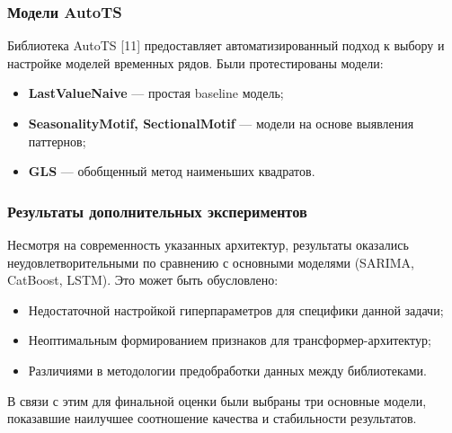 \subsubsection{Модели AutoTS}

Библиотека AutoTS [11] предоставляет автоматизированный подход к выбору и настройке моделей временных рядов. Были протестированы модели:
\begin{itemize}
	\item \textbf{LastValueNaive} --- простая baseline модель;
	\item \textbf{SeasonalityMotif, SectionalMotif} --- модели на основе выявления паттернов;
	\item \textbf{GLS} --- обобщенный метод наименьших квадратов.
\end{itemize}

\subsubsection{Результаты дополнительных экспериментов}

Несмотря на современность указанных архитектур, результаты оказались неудовлетворительными по сравнению с основными моделями (SARIMA, CatBoost, LSTM). Это может быть обусловлено:
\begin{itemize}
	\item Недостаточной настройкой гиперпараметров для специфики данной задачи;
	\item Неоптимальным формированием признаков для трансформер-архитектур;
	\item Различиями в методологии предобработки данных между библиотеками.
\end{itemize}

В связи с этим для финальной оценки были выбраны три основные модели, показавшие наилучшее соотношение качества и стабильности результатов.